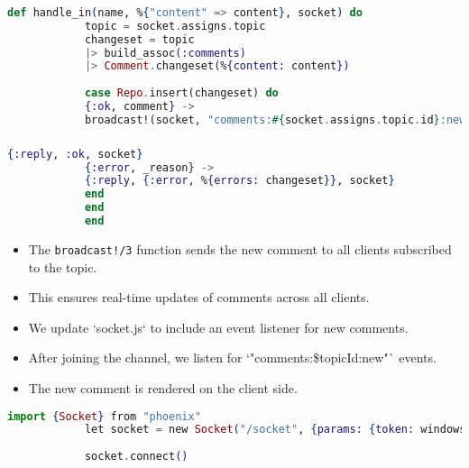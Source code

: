 \documentclass[aspectratio=169, table]{beamer}
\begin{document}
	\begin{frame}[fragile]
		\frametitle{}
		\begin{lstlisting}[language=Elixir]
			def handle_in(name, %{"content" => content}, socket) do
			topic = socket.assigns.topic
			changeset = topic
			|> build_assoc(:comments)
			|> Comment.changeset(%{content: content})
			
			case Repo.insert(changeset) do
			{:ok, comment} ->
			broadcast!(socket, "comments:#{socket.assigns.topic.id}:new", %{comment: comment})
		\end{lstlisting}
	\end{frame}
	
	\begin{frame}[fragile]
		\frametitle{}
		\begin{lstlisting}[language=Elixir]
			{:reply, :ok, socket} 
			{:error, _reason} ->
			{:reply, {:error, %{errors: changeset}}, socket}
			end
			end
			end
		\end{lstlisting}
		\begin{itemize}
			\item The \texttt{broadcast!/3} function sends the new comment to all clients subscribed to the topic.
			\item This ensures real-time updates of comments across all clients.
		\end{itemize}
	\end{frame}
	
	\begin{frame}[fragile]{}
		\begin{itemize}
			\item We update `socket.js` to include an event listener for new comments.
			\item After joining the channel, we listen for `"comments:\${topicId}:new"` events.
			\item The new comment is rendered on the client side.
		\end{itemize}
		
		\begin{lstlisting}[language=Elixir]
			import {Socket} from "phoenix"
			let socket = new Socket("/socket", {params: {token: windows.userTokern}})
			
			socket.connect()
		\end{lstlisting}
	\end{frame}
	
\end{document}
